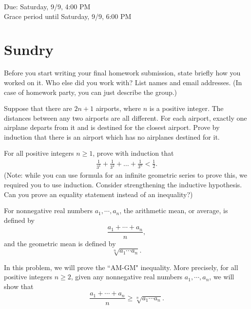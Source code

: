 \documentclass[11pt]{article}
\begin{document}
\maketitle
\fontsize{12}{15}\selectfont

\begin{center}
    Due: Saturday, 9/9, 4:00 PM \\
    Grace period until Saturday, 9/9, 6:00 PM \\
\end{center}

\section*{Sundry}
Before you start writing your final homework submission, state briefly how you worked on it.  Who else did you work with?  List names and email addresses.  (In case of homework party, you can just describe the group.)

\vspace{15pt}


Suppose that there are $2n+1$ airports, where $n$ is a positive integer. The distances between any two airports are all different. For each airport, exactly one airplane departs from it and is destined for the closest airport. Prove by induction that there is an airport which has no airplanes destined for it.


For all positive integers $n \ge 1$, prove with induction that
\begin{align*}
	\frac{1}{3^1}+\frac{1}{3^2}+ \hdots +\frac{1}{3^n} < \frac{1}{2}.
\end{align*}
(Note: while you can use formula for an infinite geometric series to prove this, we required you to use induction. Consider strengthening the inductive hypothesis. Can you prove an equality statement instead of an inequality?)


For nonnegative real numbers $a_1, \cdots, a_n$, the arithmetic mean, or average, is defined by
\[\frac{a_1 + \cdots + a_n}{n},\]
and the geometric mean is defined by
\[\sqrt[n]{a_1\cdots a_n}.\]

In this problem, we will prove the ``AM-GM" inequality. More precisely, for all positive integers $n \geq 2$, given any nonnegative real
numbers $a_1, \cdots, a_n$, we will show that
\[\frac{a_1 + \cdots + a_n}{n} \geq \sqrt[n]{a_1\cdots a_n}.\]
\end{document}
